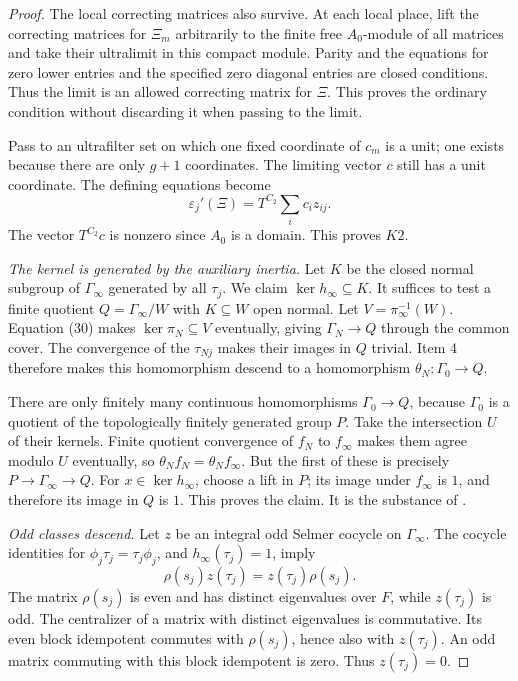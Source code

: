 \begin{proof}
The local correcting matrices also survive.
At each local place, lift the correcting matrices for
$\Xi_m$ arbitrarily to the finite free $A_0$-module of all
matrices and take their ultralimit in this compact module.
Parity and the equations for zero lower entries and the
specified zero diagonal entries are closed conditions.
Thus the limit is an allowed correcting matrix for $\Xi$.
This proves the ordinary condition without discarding it
when passing to the limit.

Pass to an ultrafilter set on which one fixed coordinate of
$c_m$ is a unit; one exists because there are only $g+1$ coordinates.
The limiting vector $c$ still has a unit coordinate.
The defining equations become
\[
                    \varepsilon_j'(\Xi)
                        =T^{C_2}\sum_i c_i z_{ij}.
\]
The vector $T^{C_2}c$ is nonzero since $A_0$ is a domain.
This proves $K2$.

\emph{The kernel is generated by the auxiliary inertia.}
Let $K$ be the closed normal subgroup of $\Gamma_\infty$
generated by all $\tau_j$.
We claim $\ker h_\infty\subseteq K$.
It suffices to test a finite quotient
$Q=\Gamma_\infty/W$ with $K\subseteq W$ open normal.
Let $V=\pi_\infty^{-1}(W)$.
Equation (30) makes $\ker\pi_N\subseteq V$ eventually, giving
$\Gamma_N\to Q$ through the common cover.
The convergence of the $\tau_{Nj}$ makes their images in $Q$
trivial.
Item 4 therefore makes this homomorphism descend to a
homomorphism $\theta_N:\Gamma_0\to Q$.

There are only finitely many continuous homomorphisms
$\Gamma_0\to Q$, because $\Gamma_0$ is a quotient of the
topologically finitely generated group $P$.
Take the intersection $U$ of their kernels.
Finite quotient convergence of $f_N$ to $f_\infty$ makes them
agree modulo $U$ eventually, so
$\theta_Nf_N=\theta_Nf_\infty$.
But the first of these is precisely
$P\to\Gamma_\infty\to Q$.
For $x\in\ker h_\infty$, choose a lift in $P$; its image under
$f_\infty$ is $1$, and therefore its image in $Q$ is $1$.
This proves the claim.  It is the substance of
.

\emph{Odd classes descend.}
Let $z$ be an integral odd Selmer cocycle on $\Gamma_\infty$.
The cocycle identities for $\phi_j\tau_j=\tau_j\phi_j$, and
$h_\infty(\tau_j)=1$, imply
\[
                       \rho(s_j)z(\tau_j)
                                  =z(\tau_j)\rho(s_j).
\]
The matrix $\rho(s_j)$ is even and has distinct eigenvalues
over $F$, while $z(\tau_j)$ is odd.
The centralizer of a matrix with distinct eigenvalues is
commutative.  Its even block idempotent commutes with
$\rho(s_j)$, hence also with $z(\tau_j)$.
An odd matrix commuting with this block idempotent is zero.
Thus $z(\tau_j)=0$.


\end{proof}
